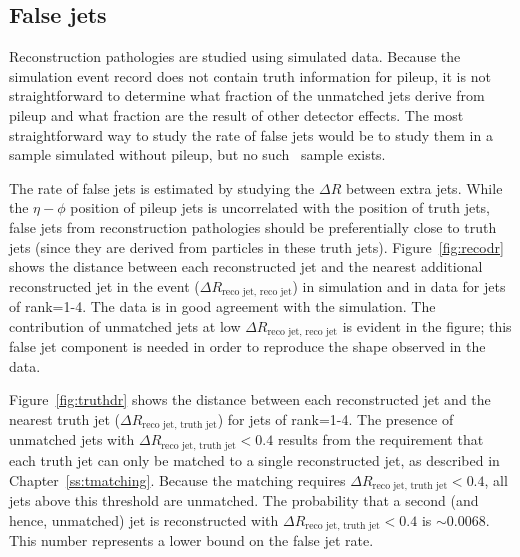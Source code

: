  \subsection{False jets}
Reconstruction pathologies are studied using simulated data. Because the simulation event record does not contain truth information for pileup, it is not straightforward to determine what fraction of the unmatched jets derive from pileup and what fraction are the result of other detector effects. The most straightforward way to study the rate of false jets would be to study them in a sample simulated without pileup, but no such \ttbar\ sample exists. 

The rate of false jets is estimated by studying the $\Delta {R}$ between extra jets. While the $\eta-\phi$ position of pileup jets is uncorrelated with the position of truth jets, false jets from reconstruction pathologies should be preferentially close to truth jets (since they are derived from particles in these truth jets).  
Figure~\ref{fig:recodr} shows the distance between each reconstructed jet and the nearest additional reconstructed jet in the event ($\Delta {R}_{\text{reco jet, reco jet}}$) in simulation and in data for jets of rank=1-4. The data is in good agreement with the simulation. 
The contribution of unmatched jets at low $\Delta {R}_{\text{reco jet, reco jet}}$ is evident in the figure;
this false jet component is needed in order to reproduce the shape observed in the data.


Figure~\ref{fig:truthdr} shows the distance between each reconstructed jet and the nearest truth jet ($\Delta {R}_{\text{reco jet, truth jet}}$) for jets of rank=1-4. The presence of unmatched jets with $\Delta {R}_{\text{reco jet, truth jet}} < 0.4$ results from the requirement that each truth jet can only be matched to a single reconstructed jet, as described in Chapter~\ref{ss:tmatching}. Because the matching requires $\Delta {R}_{\text{reco jet, truth jet}} < 0.4$, all jets above this threshold are unmatched. The probability that a second (and hence, unmatched) jet is reconstructed with $\Delta {R}_{\text{reco jet, truth jet}} < 0.4$ is $\sim 0.0068$.  This number represents a lower bound on the false jet rate.

